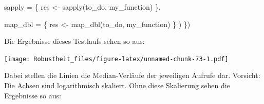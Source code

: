 \documentclass[
]{book}
\newenvironment{Shaded}{\begin{snugshade}}{\end{snugshade}}
\newcommand{\AttributeTok}[1]{\textcolor[rgb]{0.77,0.63,0.00}{#1}}
\newcommand{\DecValTok}[1]{\textcolor[rgb]{0.00,0.00,0.81}{#1}}
\newcommand{\FunctionTok}[1]{\textcolor[rgb]{0.00,0.00,0.00}{#1}}
\newcommand{\NormalTok}[1]{#1}
\newcommand{\OtherTok}[1]{\textcolor[rgb]{0.56,0.35,0.01}{#1}}
\newcommand{\SpecialCharTok}[1]{\textcolor[rgb]{0.00,0.00,0.00}{#1}}
\newcommand{\StringTok}[1]{\textcolor[rgb]{0.31,0.60,0.02}{#1}}
\begin{document}
\begin{Shaded}
\begin{Highlighting}[]
                            \AttributeTok{sapply =}\NormalTok{ \{}
\NormalTok{                              res }\OtherTok{\textless{}{-}} \FunctionTok{sapply}\NormalTok{(to\_do, my\_function)}
\NormalTok{                            \},}
                            
                            \AttributeTok{map\_dbl =}\NormalTok{ \{}
\NormalTok{                              res }\OtherTok{\textless{}{-}} \FunctionTok{map\_dbl}\NormalTok{(to\_do, my\_function)}
\NormalTok{                            \}}
\NormalTok{                          )}
\NormalTok{                        \})}
\end{Highlighting}
\end{Shaded}

Die Ergebnisse dieses Testlaufs sehen so aus:

\texttt{[image: Robustheit\_files/figure-latex/unnamed-chunk-73-1.pdf]}

Dabei stellen die Linien die Median-Verläufe der jeweiligen Aufrufe dar. Vorsicht: Die Achsen sind logarithmisch skaliert. Ohne diese Skalierung sehen die Ergebnisse so aus:

\begin{Shaded}
\end{Shaded}
\end{document}

